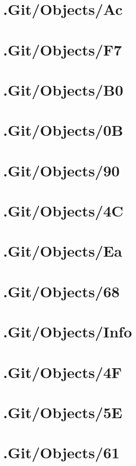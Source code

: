 \section*{.Git/Objects/Ac}

\section*{.Git/Objects/F7}

\section*{.Git/Objects/B0}

\section*{.Git/Objects/0B}

\section*{.Git/Objects/90}

\section*{.Git/Objects/4C}

\section*{.Git/Objects/Ea}

\section*{.Git/Objects/68}

\section*{.Git/Objects/Info}

\section*{.Git/Objects/4F}

\section*{.Git/Objects/5E}

\section*{.Git/Objects/61}

